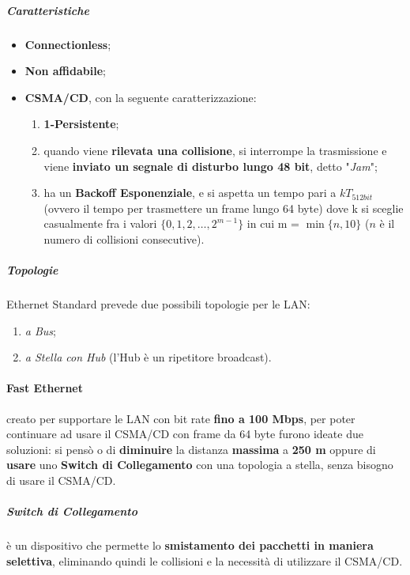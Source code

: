 \documentclass[a4paper]{article}
\begin{document}
					\newpage
						
					\subparagraph{Caratteristiche}	
						\begin{itemize}
							\item \textbf{Connectionless};
							\item \textbf{Non affidabile};
							\item \textbf{CSMA/CD}, con la seguente caratterizzazione:
								\begin{enumerate}
									\item \textbf{1-Persistente};
									\item quando viene \textbf{rilevata una collisione}, si interrompe la trasmissione e viene \textbf{inviato un segnale di disturbo lungo 48 bit}, detto "\emph{Jam}";
									\item ha un \textbf{Backoff Esponenziale}, e si aspetta un tempo pari a $ kT_{512bit} $ (ovvero il tempo per trasmettere un frame lungo 64 byte) dove k si sceglie casualmente fra i valori $ \{0, 1, 2, \dots, 2^{m-1}\} $ in cui m = $ \min\{n, 10\} $ ($ n $ è il numero di collisioni consecutive).
								\end{enumerate}
						\end{itemize}
						
					\subparagraph{Topologie}		
						Ethernet Standard prevede due possibili topologie per le LAN:
						\begin{enumerate}
							\item \emph{a Bus};
							\item \emph{a Stella con Hub} (l'Hub è un ripetitore broadcast).	
						\end{enumerate}
						
					\paragraph{Fast Ethernet}
						creato per supportare le LAN con bit rate \textbf{fino a 100 Mbps}, per poter continuare ad usare il CSMA/CD con frame da 64 byte furono ideate due soluzioni: si pensò o di \textbf{diminuire} la distanza \textbf{massima} a \textbf{250 m} oppure di \textbf{usare} uno \textbf{Switch di Collegamento} con una topologia a stella, senza bisogno di usare il CSMA/CD.
 						
 						\subparagraph{Switch di Collegamento}
 							è un dispositivo che permette lo \textbf{smistamento dei pacchetti in maniera selettiva}, eliminando quindi le collisioni e la necessità di utilizzare il CSMA/CD.
 							
\end{document}
